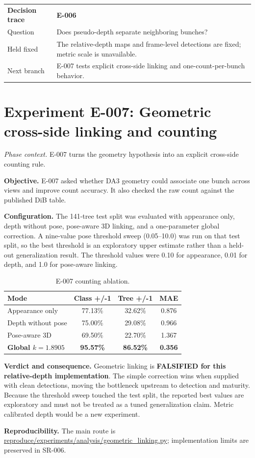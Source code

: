 \documentclass[preprint,12pt]{elsarticle}
\newcommand{\pathcode}[1]{\scriptsize\url{#1}}
\newcommand{\experiment}[2]{\par\medskip\Needspace{7\baselineskip}\section{Experiment #1: #2}}
\newcommand{\decisioncard}[4]{%
\begin{table}[H]\centering\small
\begin{tabularx}{\columnwidth}{L{0.22\columnwidth}Y}
\toprule
\textbf{Decision trace} & \textbf{#1}\\
Question & #2\\
Held fixed & #3\\
Next branch & #4\\
\bottomrule
\end{tabularx}
\end{table}}
\newcommand{\phasecontext}[1]{%
\par\smallskip\noindent\textit{Phase context.} #1\par\smallskip}
\begin{document}
\decisioncard{E-006}{Does pseudo-depth separate neighboring bunches?}{The relative-depth maps and frame-level detections are fixed; metric scale is unavailable.}{E-007 tests explicit cross-side linking and one-count-per-bunch behavior.}
\experiment{E-007}{Geometric cross-side linking and counting}
\phasecontext{E-007 turns the geometry hypothesis into an explicit cross-side counting rule.}
\textbf{Objective.} E-007 asked whether DA3 geometry could associate one bunch
across views and improve count accuracy. It also checked the raw count against
the published DiB table.

\textbf{Configuration.} The 141-tree test split was evaluated with appearance
only, depth without pose, pose-aware 3D linking, and a one-parameter global
correction. A nine-value pose threshold sweep (0.05--10.0) was run on that
test split, so the best threshold is an exploratory upper estimate rather than
a held-out generalization result. The threshold values were 0.10 for
appearance, 0.01 for depth, and 1.0 for pose-aware linking.

\begin{table}[H]
\centering
\caption{E-007 counting ablation.}
\begin{tabular}{L{0.50\columnwidth}ccc}
\toprule
\textbf{Mode} & \textbf{Class +/-1} & \textbf{Tree +/-1} & \textbf{MAE}\\
\midrule
Appearance only & 77.13\% & 32.62\% & 0.876\\
Depth without pose & 75.00\% & 29.08\% & 0.966\\
Pose-aware 3D & 69.50\% & 22.70\% & 1.367\\
\textbf{Global \(k=1.8905\)} & \textbf{95.57\%} & \textbf{86.52\%} & \textbf{0.356}\\
\bottomrule
\end{tabular}
\end{table}

\textbf{Verdict and consequence.} Geometric linking is \textbf{FALSIFIED for
this relative-depth implementation}. The simple correction wins when supplied
with clean detections, moving the bottleneck upstream to detection and
maturity. Because the threshold sweep touched the test split, the reported
best values are exploratory and must not be treated as a tuned generalization
claim. Metric calibrated depth would be a new experiment.

\textbf{Reproducibility.} The main route is
\pathcode{reproduce/experiments/analysis/geometric_linking.py}; implementation
limits are preserved in SR-006.
\end{document}
